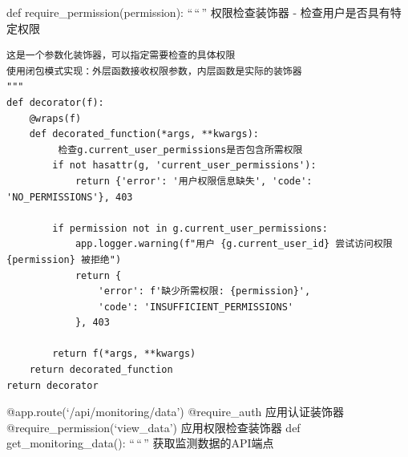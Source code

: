 def require\_permission(permission): ``\,``\,'' 权限检查装饰器 - 检查用户是否具有特定权限

\begin{verbatim}
这是一个参数化装饰器，可以指定需要检查的具体权限
使用闭包模式实现：外层函数接收权限参数，内层函数是实际的装饰器
"""
def decorator(f):
    @wraps(f)
    def decorated_function(*args, **kwargs):
         检查g.current_user_permissions是否包含所需权限
        if not hasattr(g, 'current_user_permissions'):
            return {'error': '用户权限信息缺失', 'code': 'NO_PERMISSIONS'}, 403
        
        if permission not in g.current_user_permissions:
            app.logger.warning(f"用户 {g.current_user_id} 尝试访问权限 {permission} 被拒绝")
            return {
                'error': f'缺少所需权限: {permission}', 
                'code': 'INSUFFICIENT_PERMISSIONS'
            }, 403
        
        return f(*args, **kwargs)
    return decorated_function
return decorator
\end{verbatim}

@app.route(`/api/monitoring/data') @require\_auth  应用认证装饰器 @require\_permission(`view\_data')  应用权限检查装饰器 def get\_monitoring\_data(): ``\,``\,'' 获取监测数据的API端点

